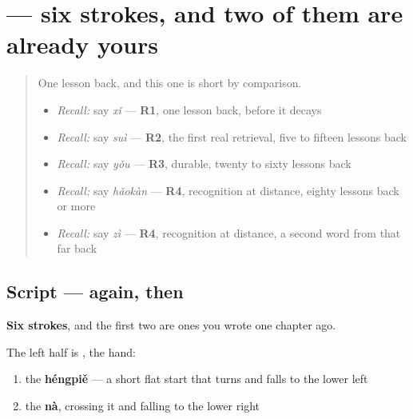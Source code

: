 \section[\texorpdfstring{\zh{欢} (huān)}{欢 (huān)}]{ — six strokes, and two of them are already yours}

\label{lesson:ZH-W28-huan}



\begin{quote}
One lesson back, and this one is short by comparison.

\begin{itemize}
\raggedright
  \item \emph{Recall:} say \emph{xǐ} — \textbf{R1}, one lesson back, before it decays
  \item \emph{Recall:} say \emph{suì} — \textbf{R2}, the first real retrieval, five to fifteen lessons back
  \item \emph{Recall:} say \emph{yǒu} — \textbf{R3}, durable, twenty to sixty lessons back
  \item \emph{Recall:} say \emph{hǎokàn} — \textbf{R4}, recognition at distance, eighty lessons back or more
  \item \emph{Recall:} say \emph{zì} — \textbf{R4}, recognition at distance, a second word from that far back
\end{itemize}
\end{quote}

\subsection*{Script —  again, then }

\begin{quote}
\end{quote}

\textbf{Six strokes}, and the first two are ones you wrote one chapter ago.

The left half is \textbf{}, the hand:

\begin{enumerate}
\raggedright
  \item the \textbf{héngpiě} — a short flat start that turns and falls to the lower left
  \item the \textbf{nà}, crossing it and falling to the lower right
\end{enumerate}

